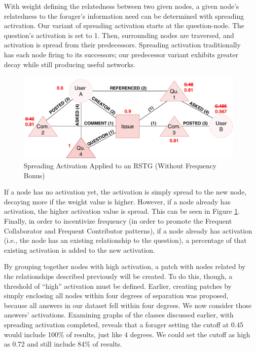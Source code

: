 \documentclass[conference]{IEEEtran}
\begin{document}
With weight defining the relatedness between two given nodes, a given node's relatedness to the forager's information need can be determined with spreading activation. Our variant of spreading activation starts at the question-node. The question's activation is set to 1. Then, surrounding nodes are traversed, and activation is spread from their predecessors. Spreading activation traditionally has each node firing to its successors; our predecessor variant exhibits greater decay while still producing useful networks.

\begin{figure}[ht]
	\centering
	\includegraphics[width=\linewidth]{img/RSTG-SA.pdf}
	\caption{Spreading Activation Applied to an RSTG (Without Frequency Bonus)}
	\label{fig:rstg-sa}
\end{figure}

If a node has no activation yet, the activation is simply spread to the new node, decaying more if the weight value is higher. However, if a node already has activation, the higher activation value is spread. This can be seen in Figure \ref{fig:rstg-sa}. Finally, in order to incentivize frequency (in order to promote the Frequent Collaborator and Frequent Contributor patterns), if a node already has activation (i.e., the node has an existing relationship to the question), a percentage of that existing activation is added to the new activation.

By grouping together nodes with high activation, a patch with nodes related by the relationships described previously will be created. To do this, though, a threshold of ``high'' activation must be defined. Earlier, creating patches by simply enclosing all nodes within four degrees of separation was proposed, because all answers in our dataset fell within four degrees. We now consider those answers' activations. Examining graphs of the classes discussed earlier, with spreading activation completed, reveals that a forager setting the cutoff at 0.45 would include 100\% of results, just like 4 degrees. We could set the cutoff as high as 0.72 and still include 84\% of results.
\end{document}
